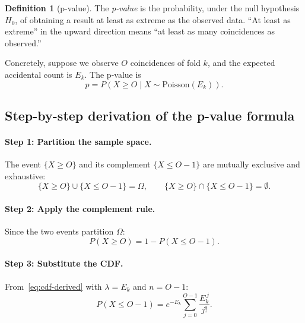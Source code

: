\documentclass[12pt]{article}
\theoremstyle{definition}
\newtheorem{definition}{Definition}
\theoremstyle{remark}
\newcommand{\Prob}[1]{P\!\left(#1\right)}
\newcommand{\Ho}{H_0}
\newcommand{\obs}{O}
\newcommand{\Eacc}{E}
\begin{document}
\begin{definition}[p-value]
  The \emph{p-value} is the probability, under the null hypothesis
  $\Ho$, of obtaining a result at least as extreme as the observed
  data.  ``At least as extreme'' in the upward direction means
  ``at least as many coincidences as observed.''
\end{definition}

Concretely, suppose we observe $\obs$ coincidences of fold $k$, and the
expected accidental count is $\Eacc_k$.  The p-value is
\begin{equation}
  p = \Prob{X \ge \obs \;\big|\; X \sim \mathrm{Poisson}(\Eacc_k)}.
  \label{eq:pval-def}
\end{equation}

\subsection{Step-by-step derivation of the p-value formula}

\paragraph{Step 1: Partition the sample space.}
The event $\{X \ge \obs\}$ and its complement $\{X \le \obs - 1\}$ are
mutually exclusive and exhaustive:
\begin{equation}
  \{X \ge \obs\} \cup \{X \le \obs - 1\} = \Omega, \qquad
  \{X \ge \obs\} \cap \{X \le \obs - 1\} = \emptyset.
  \label{eq:partition}
\end{equation}

\paragraph{Step 2: Apply the complement rule.}
Since the two events partition $\Omega$:
\begin{equation}
  \Prob{X \ge \obs} = 1 - \Prob{X \le \obs - 1}.
  \label{eq:complement}
\end{equation}

\paragraph{Step 3: Substitute the CDF.}
From~\eqref{eq:cdf-derived} with $\lambda = \Eacc_k$ and $n = \obs - 1$:
\begin{equation}
  \Prob{X \le \obs - 1} = e^{-\Eacc_k}
  \sum_{j=0}^{\obs - 1} \frac{\Eacc_k^{\,j}}{j!}.
  \label{eq:cdf-sub}
\end{equation}
\end{document}
